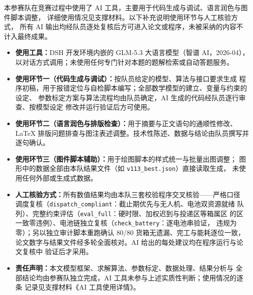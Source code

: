 \par{}\vspace{0.25em}

本参赛队在竞赛过程中使用了 AI 工具，主要用于代码生成与调试、语言润色与图件脚本调整，
详细使用情况见支撑材料。以下补充说明使用环节与人工核验方式，
所有 AI 输出均经队员逐处复核后方可进入论文或程序，未被采纳的内容不计入最终成果。

\begin{itemize}\setlength{\itemsep}{2pt}
  \item \textbf{使用工具：}DSH 开发环境内嵌的 GLM-5.3 大语言模型（智谱 AI，2026-04），
        以对话方式调用；未使用任何专门针对本题的题解检索或自动答题服务。
  \item \textbf{使用环节一（代码生成与调试）：}按队员给定的模型、算法与接口要求生成
        程序初稿，用于报错定位与自检脚本编写；全部数学模型的建立、变量与约束的设定、
        参数标定方案与算法流程均由队员确定，AI 生成的代码经队员逐行审查、按模型设定
        修改并运行验证后方可使用。
  \item \textbf{使用环节二（语言润色与排版检查）：}用于摘要与正文语句的通顺性修改、
        \LaTeX{} 排版问题排查与图注表述调整。技术性陈述、数据与结论由队员撰写并逐句确认。
  \item \textbf{使用环节三（图件脚本辅助）：}用于绘图脚本的样式统一与批量出图调整；
        图形中的数据全部由本队结果文件（如 \texttt{v113\_best.json}）直接读取生成，
        未使用任何外部或生成式数据。
  \item \textbf{人工核验方式：}所有数值结果均由本队三套校验程序交叉核验——严格口径
        调度复核（\texttt{dispatch\_compliant}：截止期优先与无人机、电池双资源就绪
        队列）、完整约束评估（\texttt{eval\_full}：硬时限、加权迟到与投递区等箱属区
        的区一致零违例）、电池链独立复核（\texttt{check\_battery}：逐电池串验证，
        违规为零）；另以独立审计脚本重跑确认 80/80 货箱无遗漏、完工与能耗逐位一致，
        论文数字与结果文件经多轮全面核对。AI 给出的每处建议均在程序运行与论文复核中
        验证后才采用。
  \item \textbf{责任声明：}本文模型框架、求解算法、参数标定、数据处理、结果分析与
        全部结论均由参赛队独立完成，AI 工具未参与上述实质性判断；使用情况的逐条
        记录见支撑材料《AI 工具使用详情》。
\end{itemize}